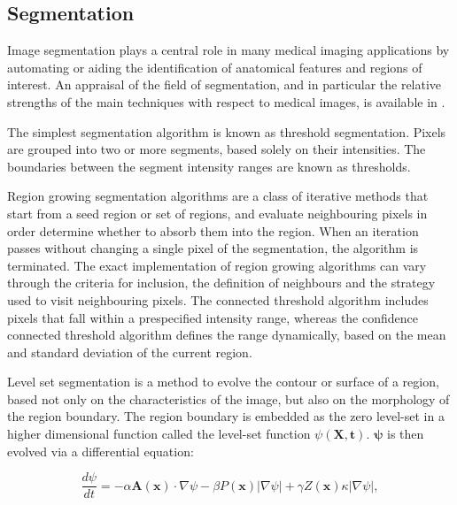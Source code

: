   \subsection{Segmentation} %
  \label{sub:segmentation}
    Image segmentation plays a central role in many medical imaging applications by automating or aiding the identification of anatomical features and regions of interest. An appraisal of the field of segmentation, and in particular the relative strengths of the main techniques with respect to medical images, is available in \cite{Pham1998,Sharma2010}.
    
    The simplest segmentation algorithm is known as threshold segmentation. Pixels are grouped into two or more segments, based solely on their intensities. The boundaries between the segment intensity ranges are known as thresholds. 
    
    Region growing segmentation algorithms are a class of iterative methods that start from a seed region or set of regions, and evaluate neighbouring pixels in order determine whether to absorb them into the region. When an iteration passes without changing a single pixel of the segmentation, the algorithm is terminated. The exact implementation of region growing algorithms can vary through the criteria for inclusion, the definition of neighbours and the strategy used to visit neighbouring pixels. The connected threshold algorithm includes pixels that fall within a prespecified intensity range, whereas the confidence connected threshold algorithm defines the range dynamically, based on the mean and standard deviation of the current region. 
    
    Level set segmentation is a method to evolve the contour or surface of a region, based not only on the characteristics of the image, but also on the morphology of the region boundary. The region boundary is embedded as the zero level-set in a higher dimensional function called the level-set function $\psi(\mathbf{X}, \mathbf{t})$. $\mathbf{\psi}$ is then evolved via a differential equation:
    
    \begin{equation}
      \frac{d\psi}{dt} = -\alpha\mathbf{A}(\mathbf{x}) \cdot \nabla \psi - \beta P(\mathbf{x})|\nabla\psi| + \gamma Z(\mathbf{x})\kappa|\nabla\psi|,
    \end{equation}
    
